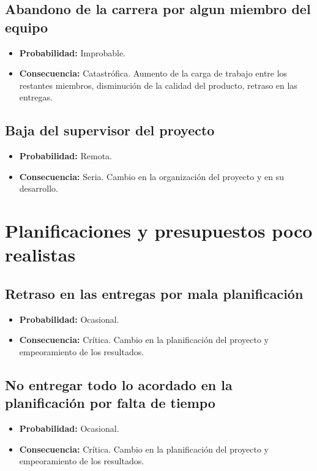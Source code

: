 \documentclass[spanish,a4paper,12pt]{report}	%
\begin{document}
\subsection*{Abandono de la carrera por algun miembro del equipo}
	\begin{itemize}
		\item \textbf {Probabilidad: }Improbable.
		\item \textbf {Consecuencia: }Catastrófica. Aumento de la carga de trabajo entre los restantes miembros, disminución de la calidad del producto, retraso en las entregas.
	\end{itemize}

\subsection*{Baja del supervisor del proyecto}
	\begin{itemize}
		\item \textbf {Probabilidad: }Remota.
		\item \textbf {Consecuencia: }Seria. Cambio en la organización del proyecto y en su desarrollo.
	\end{itemize}

%
\section{Planificaciones y presupuestos poco realistas}

\subsection*{Retraso en las entregas por mala planificación}
	\begin{itemize}
		\item \textbf {Probabilidad: }Ocasional.
		\item \textbf {Consecuencia: }Crítica. Cambio en la planificación del proyecto y empeoramiento de los resultados.
	\end{itemize}

\subsection*{No entregar todo lo acordado en la planificación por falta de tiempo}
	\begin{itemize}
		\item \textbf {Probabilidad: }Ocasional.
		\item \textbf {Consecuencia: }Crítica. Cambio en la planificación del proyecto y empeoramiento de los resultados.
	\end{itemize}
\end{document}
